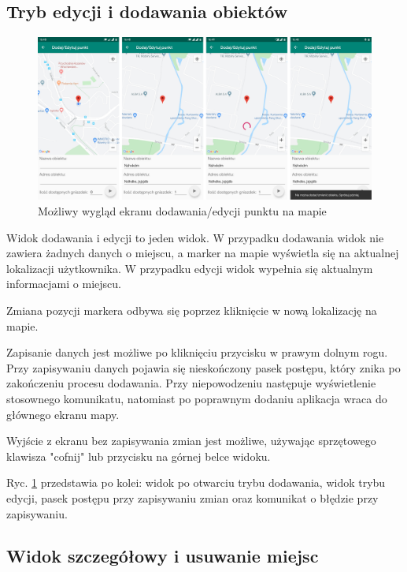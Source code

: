 \documentclass[polish,polish,a4paper,12pt]{article}
\begin{document}
	\subsection{Tryb edycji i dodawania obiektów}

	\begin{figure}[H]
		\centering
		\includegraphics[width = \textwidth]{screenshot-addedit}
		\caption{Możliwy wygląd ekranu dodawania/edycji punktu na mapie}
		\label{fig:screenshotaddedit}
	\end{figure}

	Widok dodawania i edycji to jeden widok. W przypadku dodawania widok nie zawiera żadnych danych o miejscu, a marker na mapie wyświetla się na aktualnej lokalizacji użytkownika. W przypadku edycji widok wypełnia się aktualnym informacjami o miejscu.

	Zmiana pozycji markera odbywa się poprzez kliknięcie w nową lokalizację na mapie.

	Zapisanie danych jest możliwe po kliknięciu przycisku w prawym dolnym rogu. Przy zapisywaniu danych pojawia się nieskończony pasek postępu, który znika po zakończeniu procesu dodawania. Przy niepowodzeniu następuje wyświetlenie stosownego komunikatu, natomiast po poprawnym dodaniu aplikacja wraca do głównego ekranu mapy.

	Wyjście z ekranu bez zapisywania zmian jest możliwe, używając sprzętowego klawisza "cofnij" lub przycisku na górnej belce widoku.

	Ryc. \ref{fig:screenshotaddedit} przedstawia po kolei: widok po otwarciu trybu dodawania, widok trybu edycji, pasek postępu przy zapisywaniu zmian oraz komunikat o błędzie przy zapisywaniu.

	\subsection{Widok szczegółowy i usuwanie miejsc}
\end{document}

